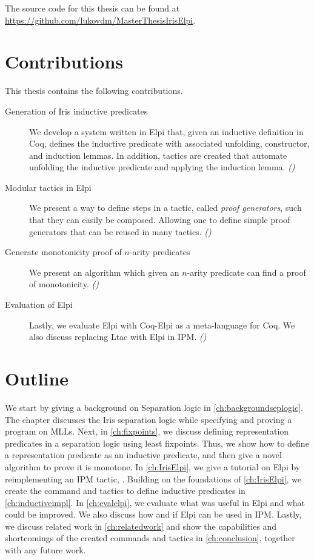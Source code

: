 \documentclass[thesis.tex]{subfiles}
\begin{document}
The source code for this thesis can be found at \url{https://github.com/lukovdm/MasterThesisIrisElpi}.

\section{Contributions}
This thesis contains the following contributions.
\begin{description}
  \item[Generation of Iris inductive predicates] We develop a system written in Elpi that, given an inductive definition in Coq, defines the inductive predicate with associated unfolding, constructor, and induction lemmas. In addition, tactics are created that automate unfolding the inductive predicate and applying the induction lemma. \emph{()}
  \item[Modular tactics in Elpi] We present a way to define steps in a tactic, called \emph{proof generators}, such that they can easily be composed. Allowing one to define simple proof generators that can be reused in many tactics. \emph{()}
  \item[Generate monotonicity proof of $n$-arity predicates] We present an algorithm which given an $n$-arity predicate can find a proof of monotonicity. \emph{()}
  \item[Evaluation of Elpi] Lastly, we evaluate Elpi with Coq-Elpi as a meta-language for Coq. We also discuss replacing Ltac with Elpi in IPM. \emph{()}
\end{description}

\section{Outline}
We start by giving a background on Separation logic in \cref{ch:backgroundseplogic}. The chapter discusses the Iris separation logic while specifying and proving a program on MLLs. Next, in \cref{ch:fixpoints}, we discuss defining representation predicates in a separation logic using least fixpoints. Thus, we show how to define a representation predicate as an inductive predicate, and then give a novel algorithm to prove it is monotone. In \cref{ch:IrisElpi}, we give a tutorial on Elpi by reimplementing an IPM tactic, . Building on the foundations of \cref{ch:IrisElpi}, we create the command and tactics to define inductive predicates in \cref{ch:inductiveimpl}. In \cref{ch:evalelpi}, we evaluate what was useful in Elpi and what could be improved. We also discuss how and if Elpi can be used in IPM. Lastly, we discuss related work in \cref{ch:relatedwork} and show the capabilities and shortcomings of the created commands and tactics in \cref{ch:conclusion}, together with any future work.
\end{document}
